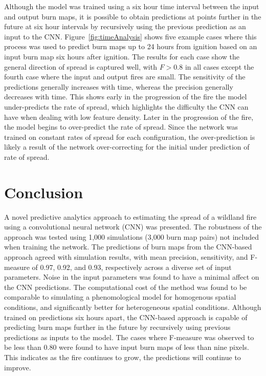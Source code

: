 \documentclass[smallcondensed]{svjour3}     %
\begin{document}
Although the model was trained using a six hour time interval between
the input and output burn maps, 
it is possible to obtain predictions at points
further in the future at six hour intervals by recursively using the previous
prediction as an input to the CNN. Figure~\ref{fig:timeAnalysis} shows
five example cases where this process was used to predict burn maps
up to 24 hours from ignition based on an input burn map six hours after
ignition. The results for each case show the general direction of spread
is captured well, with $F > 0.8$ in all cases except the fourth case where
the input and output fires are small.
The sensitivity of the predictions generally increases
with time, whereas the precision generally decreases with time.
This shows early in the progression of the fire the model
under-predicts the rate of spread, which highlights the difficulty
the CNN can have when dealing with low feature density. Later in
the progression of the fire, the model begins to over-predict the
rate of spread. Since the network was trained on constant rates
of spread for each configuration, the over-prediction is likely
a result of the network over-correcting for the initial
under prediction of rate of spread.































\section{Conclusion}
\label{s:Conclusion}

A novel predictive analytics approach to estimating the spread of
a wildland fire using a convolutional neural network (CNN) was presented.
The robustness of the approach was tested using 1,000 simulations (3,000
burn map pairs) not included when training the network. The predictions
of burn maps from the CNN-based approach agreed with simulation results,
with mean precision, sensitivity, and F-measure of 0.97, 0.92, and 0.93,
respectively across a diverse set of input parameters.
Noise in the input parameters was found to have a minimal affect on
the CNN predictions. The computational cost of the method was found
to be comparable to simulating a phenomological model for homogenous
spatial conditions, and significantly better for heterogeneous spatial
conditions. Although trained on predictions six hours apart, the
CNN-based approach is capable of predicting burn maps further
in the future by recursively using previous predictions as inputs to
the model. The cases where F-measure was observed to be less than 0.80
were found to have input burn maps of less than nine pixels. This
indicates as the fire continues to grow, the predictions will continue
to improve.
\end{document}
